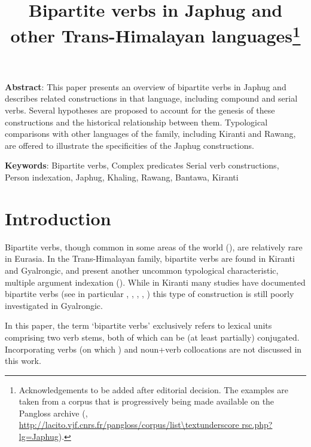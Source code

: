 \documentclass[11pt]{article}
\begin{document}
 
\title{Bipartite verbs in Japhug and other Trans-Himalayan languages\footnote{Acknowledgements to be added after editorial decision.  The examples are taken from a corpus that is progressively being made available on the Pangloss archive (\citealt{michailovsky14pangloss}, 
 \url{http://lacito.vjf.cnrs.fr/pangloss/corpus/list\textunderscore rsc.php?lg=Japhug}).  }}
\maketitle


\textbf{Abstract}: This paper presents an overview of bipartite verbs in Japhug and describes related constructions in that language, including compound and serial verbs. Several hypotheses are proposed to account for the genesis of these constructions and the historical relationship between them. Typological comparisons with other languages of the family, including Kiranti and Rawang, are offered to illustrate the specificities of the Japhug constructions.

\textbf{Keywords}: Bipartite verbs, Complex predicates Serial verb constructions, Person indexation, Japhug, Khaling, Rawang, Bantawa, Kiranti

\sloppy

 \section*{Introduction}
Bipartite verbs, though common in some areas of the world (\citealt{delancey96bipartite}), are relatively rare in Eurasia. In the Trans-Himalayan family, bipartite verbs are found in Kiranti and Gyalrongic, and present another uncommon typological characteristic, 
multiple argument indexation (\citealt{denk15multiple}). While in Kiranti many studies have documented bipartite verbs (see in particular \citealt{driem87}, \citealt{rutgers98yamphu}, \citealt{bickel07chintang}, \citealt{doornenbal09}, \citealt{schackow15yakkha}) this type of construction is still poorly investigated in Gyalrongic.

In this paper, the term `bipartite verbs' exclusively refers to lexical units comprising two verb stems, both of which can be (at least partially) conjugated. Incorporating verbs (on which \citealt{jacques12incorp}) and noun+verb collocations are not discussed in this work.
\end{document}
